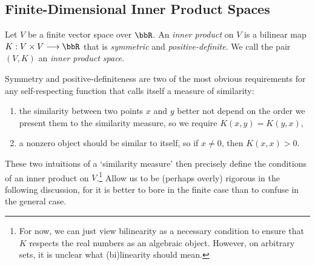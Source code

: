 \documentclass[twoside,11pt]{homework}
\renewcommand{\to}{\longrightarrow}
\begin{document}
\subsection{Finite-Dimensional Inner Product Spaces}
\begin{definition}\label{IP}
  Let $V$ be a finite vector space over $\bbR$. An \emph{inner product} on $V$ is a bilinear map $K : V \times V \to \bbR$
  that is \emph{symmetric} and \emph{positive-definite}. We call the pair $(V,K)$ an \emph{inner product space}.
\end{definition}
Symmetry and positive-definiteness are two of the most obvious requirements for any self-respecting function that calls itself a measure of similarity:
\begin{enumerate}
\item  the similarity between two points $x$ and $y$ better not depend on the order we present them to the similarity measure, so we require $K(x,y) = K(y,x)$,
\item a nonzero object should be similar to itself, so if $x \ne 0$, then $K(x,x) > 0$.
\end{enumerate}
These two intuitions of a `similarity measure' then precisely define the conditions of an inner product on $V$.\footnote{For now, we can just view bilinearity as a necessary condition to ensure that $K$ respects the real numbers as an algebraic object. However, on arbitrary sets, it is unclear what (bi)linearity should mean.} Allow us to be (perhaps overly) rigorous in the following discussion, for it is better to bore in the finite case than to confuse in the general case.
\end{document}
